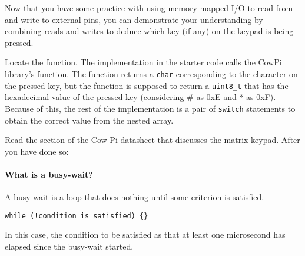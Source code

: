 Now that you have some practice with using memory-mapped I/O to read from and write to external pins, you can demonstrate your understanding by combining reads and writes to deduce which key (if any) on the keypad is being pressed.

Locate the  function.
The implementation in the starter code calls the CowPi library's  function.
The  function returns a \lstinline{char} corresponding to the character on the pressed key,
but the  function is supposed to return a \lstinline{uint8_t} that has the hexadecimal value of the pressed key (considering \# as 0xE and * as 0xF).
Because of this, the rest of the implementation is a pair of \lstinline{switch} statements to obtain the correct value from the  nested array.

Read the section of the Cow Pi datasheet that \href{https://cow-pi.readthedocs.io/en/latest/hardware/inputs.html#matrix-keypad}{discusses the matrix keypad}.
After you have done so:

\begin{description}
        \begin{description}
        \end{description}
\end{description}

\paragraph{What is a busy-wait?}
A busy-wait is a loop that does nothing until some criterion is satisfied.
\begin{lstlisting}[numbers=none, basicstyle=\ttfamily\small]
    while (!condition_is_satisfied) {}
\end{lstlisting}
In this case, the condition to be satisfied as that at least one microsecond has elapsed since the busy-wait started.
\begin{description}
\end{description}

